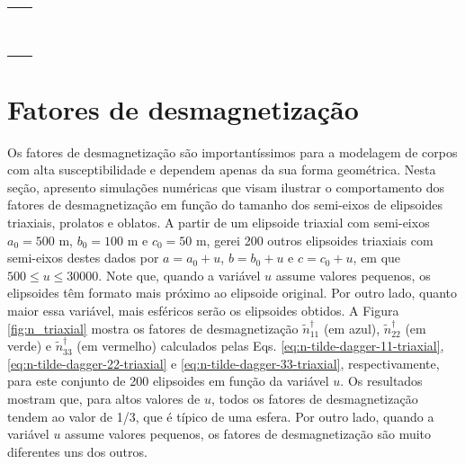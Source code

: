 \begin{table}[h!]
	\begin{center}
		\begin{tabular}{lc}
			
			& \\
			& \\
			& \\
			& \\
			& \\
			& \\
			& \\
			& \\
			& \\
			& \\
		\end{tabular}
	\end{center}
\end{table}

\section{Fatores de desmagnetização}

Os fatores de desmagnetização são importantíssimos para a modelagem de corpos com alta susceptibilidade e dependem apenas da sua forma geométrica. 
Nesta seção, apresento simulações numéricas que visam ilustrar o comportamento dos fatores de desmagnetização em função do tamanho dos semi-eixos de elipsoides triaxiais, prolatos e oblatos. A partir de um elipsoide triaxial com semi-eixos $a_0=500$ m, $b_0=100$ m e $c_0=50$ m, gerei 200 outros elipsoides triaxiais com semi-eixos destes dados por $a=a_0+u$, $b=b_0+u$ e $c=c_0+u$, em que $500 \le u \le 30000$. Note que, quando a variável $u$ assume valores pequenos, os elipsoides têm formato mais próximo ao elipsoide original. Por outro lado, quanto maior essa variável, mais esféricos serão os elipsoides obtidos. A Figura \ref{fig:n_triaxial} mostra os fatores de desmagnetização $\tilde{n}^{\dagger}_{11}$ (em azul), $\tilde{n}^{\dagger}_{22}$ (em verde) e $\tilde{n}^{\dagger}_{33}$ (em vermelho) calculados pelas Eqs. \ref{eq:n-tilde-dagger-11-triaxial}, \ref{eq:n-tilde-dagger-22-triaxial} e \ref{eq:n-tilde-dagger-33-triaxial}, respectivamente, para este conjunto de 200 elipsoides em função da variável $u$. Os resultados mostram que, para altos valores de $u$, todos os fatores de desmagnetização tendem ao valor de 1/3, que é típico de uma esfera. Por outro lado, quando a variável $u$ assume valores pequenos, os fatores de desmagnetização são muito diferentes uns dos outros.

